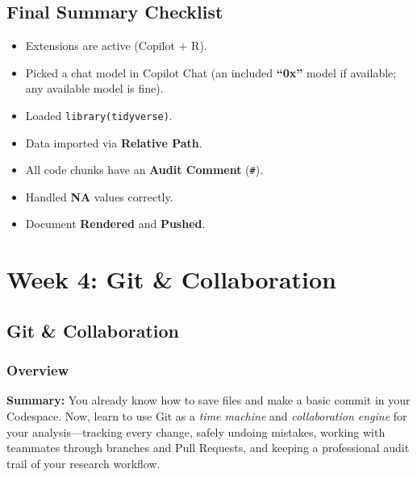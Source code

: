 \documentclass[
  letterpaper,
  DIV=11,
  numbers=noendperiod,
  oneside]{scrreprt}
\begin{document}
\chapter{Final Summary Checklist}\label{final-summary-checklist}

\begin{itemize}
\item[$\square$]
  Extensions are active (Copilot + R).
\item[$\square$]
  Picked a chat model in Copilot Chat (an included \textbf{``0x''} model
  if available; any available model is fine).
\item[$\square$]
  Loaded \texttt{library(tidyverse)}.
\item[$\square$]
  Data imported via \textbf{Relative Path}.
\item[$\square$]
  All code chunks have an \textbf{Audit Comment} (\texttt{\#}).
\item[$\square$]
  Handled \textbf{NA} values correctly.
\item[$\square$]
  Document \textbf{Rendered} and \textbf{Pushed}.
\end{itemize}

\part{Week 4: Git \& Collaboration}

\chapter*{Git \& Collaboration}\label{git-collaboration}


\section*{Overview}\label{overview-3}


\textbf{Summary:} You already know how to save files and make a basic
commit in your Codespace. Now, learn to use Git as a \emph{time machine}
and \emph{collaboration engine} for your analysis---tracking every
change, safely undoing mistakes, working with teammates through branches
and Pull Requests, and keeping a professional audit trail of your
research workflow.
\end{document}
